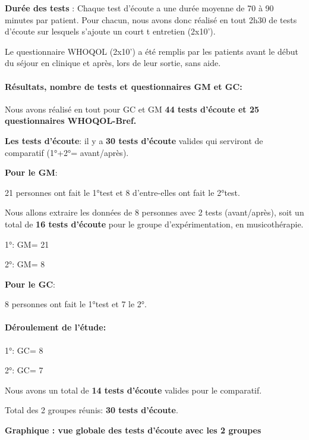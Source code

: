 	
	
	\textbf{Durée des tests} : Chaque test d'écoute a une durée  moyenne de
        70 à 90 minutes par patient. Pour chacun, nous avons donc réalisé
        en tout 2h30 de tests d'écoute sur lesquels
        s'ajoute un court 
t        entretien (2x10').

        
        Le questionnaire WHOQOL (2x10')  a été remplis par les
        patients avant le début du séjour en clinique et après, lors
        de leur sortie, sans aide.
        
       
      
      \paragraph{Résultats, nombre de tests et questionnaires GM et GC:}

       
     Nous avons réalisé en tout pour GC et GM \textbf{44 tests d'écoute et 25 questionnaires 
     WHOQOL-Bref.}
     
     \textbf{Les tests d'écoute}: il y a\textbf{ 30 tests d'écoute } valides qui serviront de
     comparatif (1°+2°= avant/après).
     
\textbf{Pour le GM}:
     
     21 personnes ont fait le 1°test et 8 d'entre-elles ont fait le
     2°test.

     Nous allons extraire les données de 8 personnes avec 2 tests (avant/après), soit  un
     total de \textbf{16 tests d'écoute } pour le groupe
     d'expérimentation, en musicothérapie.

     
     1°: GM= 21
    
     2°: GM= 8
     
     \textbf{ Pour le GC}:

     
     8 personnes ont fait le 1°test et 7 le 2°.
     
\paragraph{Déroulement de l'étude:}


     1°: GC= 8

     2°: GC= 7
     
     Nous avons un total de \textbf{14 tests d'écoute} valides pour le
     comparatif.

     
Total des 2 groupes réunis:\textbf{ 30 tests d'écoute}.
     
\textbf{Graphique : vue globale des tests d'écoute avec les 2 groupes}




